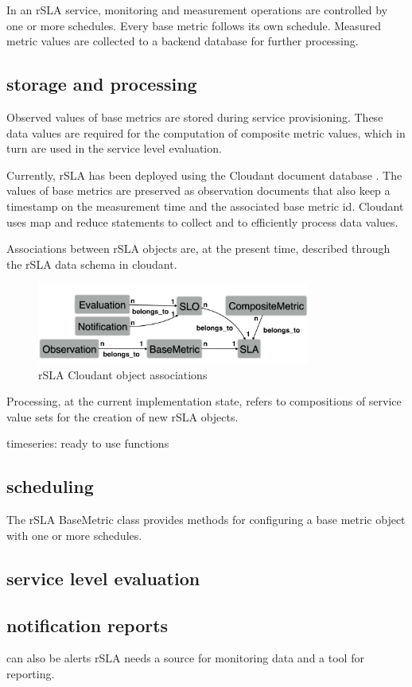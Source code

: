 In an rSLA service, monitoring and measurement operations are controlled by one or more schedules. Every base metric follows its own schedule. Measured metric values are collected to a backend database for further processing. 
\subsection{storage and processing}
Observed values of base metrics are stored during service provisioning. These data values are required for the computation of composite metric values, which in turn are used in the service level evaluation. 

Currently, rSLA has been deployed using the Cloudant document database \cite{cloudant}. The values of base metrics are preserved as observation documents that also keep a timestamp on the measurement time and the associated base metric id. Cloudant uses map and reduce statements to collect and to efficiently process data values. 

Associations between rSLA objects are, at the present time, described through the rSLA data schema in cloudant.

\begin{figure}
\centering
\includegraphics[width=0.8\textwidth]{pics/schema}
\caption{\label{rslaobject} rSLA Cloudant object associations}
\end{figure}

Processing, at the current implementation state, refers to compositions of service value sets for the creation of new rSLA objects.

timeseries: ready to use functions
\subsection{scheduling}\label{schedule}
The rSLA BaseMetric class provides methods for configuring a base metric object with one or more schedules.
\subsection{service level evaluation}

\subsection{notification reports}
can also be alerts
rSLA needs a source for monitoring data and a tool for reporting.